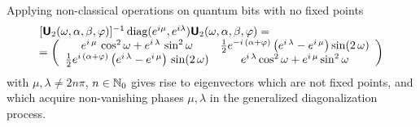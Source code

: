 \documentclass{llncs}
\begin{document}
Applying non-classical operations on quantum bits with no fixed points
\begin{equation}
\begin{array}{c}
[\textsf{\textbf{U}}_2(\omega ,\alpha ,\beta ,\varphi )]^{-1}\,\mbox{diag}( e^{i\mu } ,
e^{i\lambda }) \textsf{\textbf{U}}_2(\omega ,\alpha ,\beta ,\varphi ) =
\qquad
\qquad
\qquad
\qquad
\qquad  \\
=
\left(
\begin{array}{cc}
e^{i\,\mu }\,\cos^2 \omega  + e^{i\,\lambda }\,\sin^2 \omega
&
{1\over 2}
e^{-i\,\left( \alpha  + \varphi \right) }
\left( e^{i\,\lambda } - e^{i\,\mu } \right)
\sin (2\,\omega )
\\
{1\over 2}
e^{i\,\left( \alpha  + \varphi \right)}
\left( e^{i\,\lambda } - e^{i\,\mu }  \right) \,\sin (2\,\omega )
&
e^{i\,\lambda } \cos^2 \omega  + e^{i\,\mu }\sin^2 \omega
 \end{array}
\right)
\end{array}
\end{equation}
with $\mu ,\lambda \neq 2n\pi$, $n\in {\Bbb N}_0$ gives rise to
eigenvectors which are not fixed points, and which acquire non-vanishing
phases $\mu , \lambda$ in the generalized diagonalization process.
\end{document}
